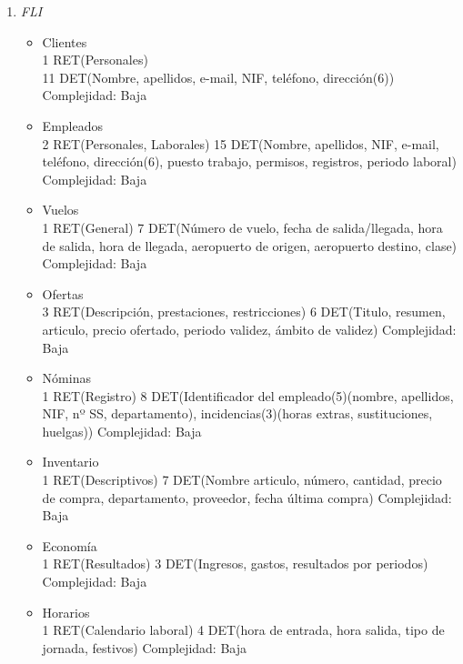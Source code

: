 \begin{enumerate}
	\item \textit{FLI}
	\begin{itemize}
		\item Clientes \\
			1 RET(Personales) \\
			11 DET(Nombre, apellidos, e-mail, NIF, teléfono, dirección(6)) \\
			Complejidad: Baja\\
		\item Empleados \\
			2 RET(Personales, Laborales)
			15 DET(Nombre, apellidos, NIF, e-mail, teléfono, dirección(6), puesto trabajo, permisos, registros, periodo laboral)
			Complejidad: Baja\\
		\item Vuelos\\
			1 RET(General)
			7 DET(Número de vuelo, fecha de salida/llegada, hora de salida, hora de llegada, aeropuerto de origen, aeropuerto destino,
			clase)
			Complejidad: Baja\\
		\item Ofertas\\
			3 RET(Descripción, prestaciones, restricciones)
			6 DET(Titulo, resumen, articulo, precio ofertado, periodo validez, ámbito de validez)
			Complejidad: Baja\\
		\item Nóminas\\
			1 RET(Registro)
			8 DET(Identificador del empleado(5)(nombre, apellidos, NIF, nº SS, departamento), incidencias(3)(horas extras,
			sustituciones, huelgas))
			Complejidad: Baja\\
		\item Inventario\\
			1 RET(Descriptivos)
			7 DET(Nombre articulo, número, cantidad, precio de compra, departamento, proveedor, fecha última compra)
			Complejidad: Baja\\
		\item Economía\\
			1 RET(Resultados)
			3 DET(Ingresos, gastos, resultados por periodos)
			Complejidad: Baja\\
		\item Horarios\\
			1 RET(Calendario laboral)
			4 DET(hora de entrada, hora salida, tipo de jornada, festivos)
			Complejidad: Baja\\
	\end{itemize}

\end{enumerate}
